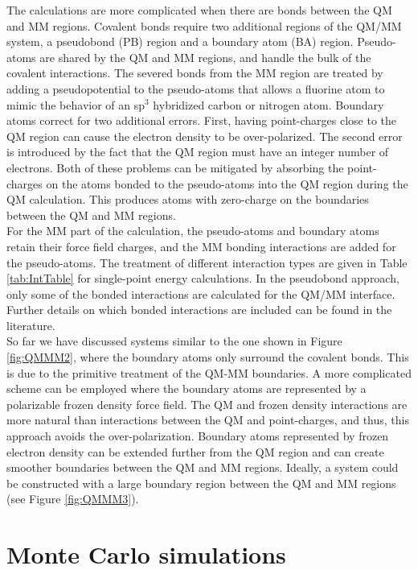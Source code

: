 \documentclass[12pt]{report}
\begin{document}
The calculations are more complicated when there are bonds between the QM and
MM regions.
Covalent bonds require two additional regions of the QM/MM system,
a pseudobond (PB) region and a boundary atom (BA) region.
Pseudo-atoms are shared by the QM and MM regions, and handle the bulk of the
covalent interactions.
The severed bonds from the MM region are treated by adding a pseudopotential
to the pseudo-atoms that allows a fluorine atom to mimic the behavior of an
sp$^3$ hybridized carbon or nitrogen atom.
Boundary atoms correct for two additional errors.
First, having point-charges close to the QM region can cause the electron
density to be over-polarized.
The second error is introduced by the fact that the QM region must have an
integer number of electrons.
Both of these problems can be mitigated by absorbing the point-charges on the
atoms bonded to the pseudo-atoms into the QM region during the QM calculation.
This produces atoms with zero-charge on the boundaries between the QM and MM
regions. \\

For the MM part of the calculation, the pseudo-atoms and boundary atoms retain
their force field charges, and the MM bonding interactions are added for the
pseudo-atoms.
The treatment of different interaction types are given in Table
\ref{tab:IntTable} for single-point energy calculations.
In the pseudobond approach, only some of the bonded interactions are
calculated for the QM/MM interface.
Further details on which bonded interactions are included can be found in the
literature. \\

So far we have discussed systems similar to the one shown in Figure
\ref{fig:QMMM2}, where the boundary atoms only surround the covalent bonds.
This is due to the primitive treatment of the QM-MM boundaries.
A more complicated scheme can be employed where the boundary atoms are
represented by a polarizable frozen density force field.
The QM and frozen density interactions are more natural than interactions
between the QM and point-charges, and thus, this approach avoids the
over-polarization.
Boundary atoms represented by frozen electron density can be extended further
from the QM region and can create smoother boundaries between the QM and MM
regions.
Ideally, a system could be constructed with a large boundary region between
the QM and MM regions (see Figure \ref{fig:QMMM3}).

\section{Monte Carlo simulations}
\end{document}
